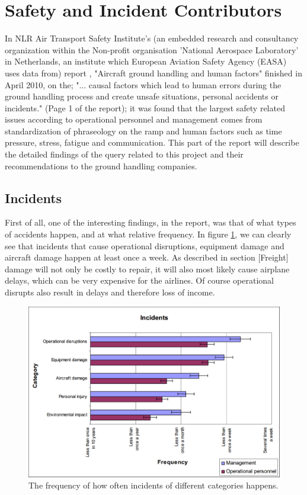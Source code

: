 \section{Safety and Incident Contributors}
In NLR Air Transport Safety Institute's (an embedded research and consultancy organization within the Non-profit organisation 'National Aerospace Laboratory' in Netherlands, an institute which European Aviation Safety Agency (EASA) uses data from) report \cite{NLR_human_factors}, "Aircraft ground handling and human factors" finished in April 2010, on the; "... causal factors which lead to human errors during the ground handling process and create unsafe situations, personal accidents or incidents." (Page 1 of the report); it was found that the largest safety related issues according to operational personnel and management comes from standardization of phraseology on the ramp and human factors such as time pressure, stress, fatigue and communication. This part of the report will describe the detailed findings of the query related to this project and their recommendations to the ground handling companies.

\subsection{Incidents}
First of all, one of the interesting findings, in the report, was that of what types of accidents happen, and at what relative frequency. In figure \ref{FrequencyOfIncidents}, we can clearly see that incidents that cause operational disruptions, equipment damage and aircraft damage happen at least once a week. As described in section [Freight] damage will not only be costly to repair, it will also most likely cause airplane delays, which can be very expensive for the airlines. Of course operational disrupts also result in delays and therefore loss of income.

\begin{figure}[H]
\centering
\includegraphics[width=\textwidth]{Grafik/FrequencyOfIncidents}
\caption{The frequency of how often incidents of different categories happens.}
\label{FrequencyOfIncidents}
\end{figure}

